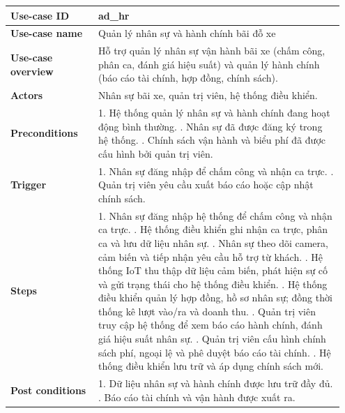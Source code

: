 \documentclass[15pt, a4paper]{article}
\begin{document}
\begin{table}[htpb]
\centering
\renewcommand{\arraystretch}{1.4}
\begin{tabular}{|p{0.25\linewidth}|p{0.7\linewidth}|}
\hline
\textbf{Use-case ID} & ad\_hr \\ \hline
\textbf{Use-case name} & Quản lý nhân sự và hành chính bãi đỗ xe \\ \hline
\textbf{Use-case overview} & Hỗ trợ quản lý nhân sự vận hành bãi xe (chấm công, phân ca, đánh giá hiệu suất) và quản lý hành chính (báo cáo tài chính, hợp đồng, chính sách). \\ \hline
\textbf{Actors} & Nhân sự bãi xe, quản trị viên, hệ thống điều khiển. \\ \hline
\textbf{Preconditions} & 
1. Hệ thống quản lý nhân sự và hành chính đang hoạt động bình thường. \newline
2. Nhân sự đã được đăng ký trong hệ thống. \newline
3. Chính sách vận hành và biểu phí đã được cấu hình bởi quản trị viên. \\ \hline
\textbf{Trigger} & 
1. Nhân sự đăng nhập để chấm công và nhận ca trực. \newline
2. Quản trị viên yêu cầu xuất báo cáo hoặc cập nhật chính sách. \\ \hline
\textbf{Steps} & 
1. Nhân sự đăng nhập hệ thống để chấm công và nhận ca trực. \newline
2. Hệ thống điều khiển ghi nhận ca trực, phân ca và lưu dữ liệu nhân sự. \newline
3. Nhân sự theo dõi camera, cảm biến và tiếp nhận yêu cầu hỗ trợ từ khách. \newline
4. Hệ thống IoT thu thập dữ liệu cảm biến, phát hiện sự cố và gửi trạng thái cho hệ thống điều khiển. \newline
5. Hệ thống điều khiển quản lý hợp đồng, hồ sơ nhân sự; đồng thời thống kê lượt vào/ra và doanh thu. \newline
6. Quản trị viên truy cập hệ thống để xem báo cáo hành chính, đánh giá hiệu suất nhân sự. \newline
7. Quản trị viên cấu hình chính sách phí, ngoại lệ và phê duyệt báo cáo tài chính. \newline
8. Hệ thống điều khiển lưu trữ và áp dụng chính sách mới. \\ \hline
\textbf{Post conditions} & 
1. Dữ liệu nhân sự và hành chính được lưu trữ đầy đủ. \newline
2. Báo cáo tài chính và vận hành được xuất ra. \newline

\end{tabular}
\end{table}
\end{document}
